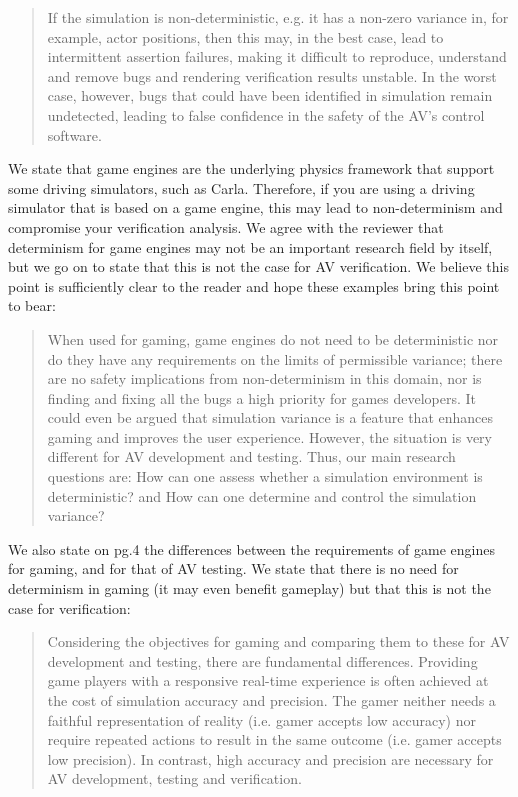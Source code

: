 \documentclass[11pt, a4paper]{letter} %
\begin{document}
\begin{letter}
\begin{quote}
If the simulation is non-deterministic, e.g. it has a non-zero variance in, for example, actor positions, then this may, in the best case, lead to intermittent assertion failures, making it difficult to reproduce, understand and remove bugs and rendering verification results unstable. In the worst case, however, bugs that could have been identified in simulation remain undetected, leading to false confidence in the safety of the AV’s control software.
\end{quote}

We state that game engines are the underlying physics framework that support some driving simulators, such as Carla. Therefore, if you are using a driving simulator that is based on a game engine, this may lead to non-determinism and compromise your verification analysis. We agree with the reviewer that determinism for game engines may not be an important research field by itself, but we go on to state that this is not the case for AV verification. We believe this point is sufficiently clear to the reader and hope these examples bring this point to bear:

\begin{quote}
When used for gaming, game engines do not need to be deterministic nor do they have any requirements on the limits of permissible variance; there are no safety implications from non-determinism in this domain, nor is finding and fixing all the bugs a high priority for games developers. It could even be argued that simulation variance is a feature that enhances gaming and improves the user experience. However, the situation is very different for AV development and testing. Thus, our main research questions are: How can one assess whether a simulation environment is deterministic? and How can one determine and control the simulation variance? 
\end{quote}

We also state on pg.4 the differences between the requirements of game engines for gaming, and for that of AV testing. We state that there is no need for determinism in gaming (it may even benefit gameplay) but that this is not the case for verification: 

\begin{quote}
Considering the objectives for gaming and comparing them to these for AV development and testing, there are fundamental differences. Providing game players with a responsive real-time experience is often achieved at the cost of simulation accuracy and precision. The gamer neither needs a faithful representation of reality (i.e. gamer accepts low accuracy) nor require repeated actions to result in the same outcome (i.e. gamer accepts low precision). In contrast, high accuracy and precision are necessary for AV development, testing and verification.
\end{quote}


\end{letter}
\end{document}
